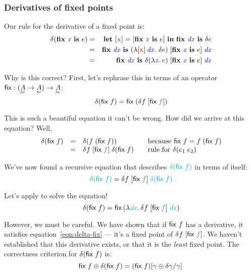 \documentclass{rntz}
\newcommand{\preserve}[1]{{\color{ForestGreen}{#1}}}
\begin{document}

\subsubsection{Derivatives of fixed points}

Our rule for the derivative of a fixed point is:
\begin{eqnarray*}
  \delta(\fix{\m{x}} e)
  &=& \letdisc{\d{x}}{\disc{\fix{\m{x}} e}} \fix{\m{dx}} \delta e\\
  &=& \fix{\m{dx}}
      (\fn \disc{\d{x}}\, \m{dx}\binder\, \delta e)
      \; \disc{\fix{\m{x}} e}
      \; \m{dx}\\
  &=& \fix{\m{dx}} \delta(\lam{\m{x}} e)
      \; \disc{\fix{\m{x}} e}
      \; \m{dx}
\end{eqnarray*}

Why is this correct? First, let's rephrase this in terms of an operator
$\ms{fix} : (\fixtype{A} \to \fixtype{A}) \to \fixtype{A}$:
\begin{equation}
  \delta(\ms{fix}\; f) = \ms{fix}\; (\delta f \;\disc{\ms{fix}\; \preserve{f}})
\end{equation}

This is such a beautiful equation it can't be wrong. How did we arrive at this
equation? Well,
\[
\begin{array}{rcl>{\hspace{1em}}l}
  \delta(\ms{fix}\; f)
  &=& \delta(f \;(\ms{fix}\;f))
  & \text{because}~\ms{fix}\; f = f\;(\ms{fix}\;f)\\
  &=& \delta f \;\disc{\ms{fix}\; \preserve{f}} \; \delta(\ms{fix}\; f)
  & \text{rule for}~\delta(e_1\;e_2)
\end{array}
\]

We've now found a recursive equation that describes
${\color{Cyan}\delta(\ms{fix}\;f)}$ in terms of itself:
\begin{equation}\label{eqn:delta-fix}
  {\color{Cyan} \delta(\ms{fix}\;f)}
  = \delta f\;\disc{\ms{fix}\; \preserve{f}}\;{\color{Cyan}\delta(\ms{fix}\;f)}
\end{equation}

Let's apply  to solve the equation!
\begin{equation}
  \delta(\ms{fix}\; f)
  =
  \ms{fix}\,(\lam{\m{\color{Cyan} dx}}
  \delta f \;\disc{\ms{fix}\;\preserve{f}} \;{\m{\color{Cyan} dx}})
\end{equation}

However, we must be careful. We have shown that if $\mathsf{fix}~f$ has a
derivative, it satisfies equation~\ref{eqn:delta-fix} --- it's a fixed point of
$\delta f\; [\ms{fix}\; \preserve{f}]$. We haven't established that this
derivative exists, or that it is the \emph{least} fixed point.
%
The correctness criterion for $\delta(\mathsf{fix}\; f)$ is:
%
\begin{equation}
  \mathsf{fix}\;f \oplus \delta(\mathsf{fix}\;f)
  = (\mathsf{fix}\;f)[{\gamma \oplus \delta\gamma/\gamma}]\,
\end{equation}
\end{document}
